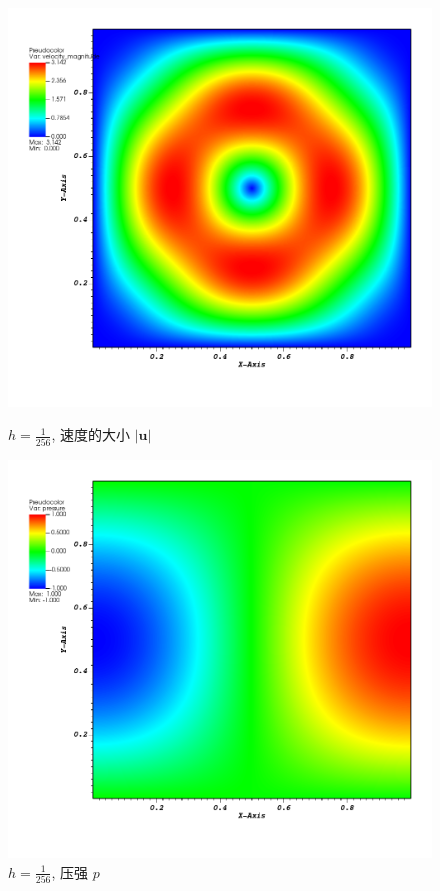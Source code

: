 \documentclass[lang=cn,11pt,a4paper]{elegantpaper}
\begin{document}
\begin{figure}[H]
\begin{minipage}[t]{0.32\textwidth}
        \includegraphics[width=\linewidth]{fig/velocity_mag.png}
        \caption{\small $h=\frac{1}{256}$, 速度的大小 $|\mathbf{u}|$}
    \end{minipage}
    \hfill
    \begin{minipage}[t]{0.32\textwidth}
        \centering
        \includegraphics[width=\linewidth]{fig/pressure.png}
        \caption{\small $h=\frac{1}{256}$, 压强 $p$}
    \end{minipage}
\end{figure}
\end{document}
